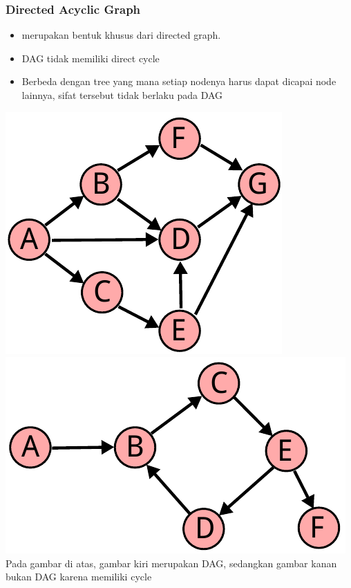 \begin{frame}
\frametitle{Directed Acyclic Graph}
\begin{itemize}
  \item {} merupakan bentuk khusus dari directed graph.
  \item DAG tidak memiliki \alert{direct cycle}
  \item Berbeda dengan tree yang mana setiap nodenya harus dapat dicapai node lainnya, sifat tersebut tidak berlaku pada DAG
\end{itemize}

\includegraphics[width=4 cm]{asset/dag.pdf}
\hspace{\fill}
\includegraphics[width=5 cm]{asset/not-dag.pdf}
\newline\newline
Pada gambar di atas, gambar kiri merupakan DAG, sedangkan gambar kanan bukan DAG karena memiliki cycle
\end{frame}


